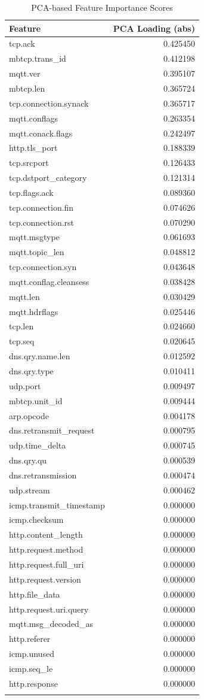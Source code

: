 \documentclass{article}
\begin{document}
\begin{longtable}{lr}
\toprule
Feature & PCA Loading (abs) \\
\midrule
tcp.ack & 0.425450 \\
mbtcp.trans_id & 0.412198 \\
mqtt.ver & 0.395107 \\
mbtcp.len & 0.365724 \\
tcp.connection.synack & 0.365717 \\
mqtt.conflags & 0.263354 \\
mqtt.conack.flags & 0.242497 \\
http.tls_port & 0.188339 \\
tcp.srcport & 0.126433 \\
tcp.dstport_category & 0.121314 \\
tcp.flags.ack & 0.089360 \\
tcp.connection.fin & 0.074626 \\
tcp.connection.rst & 0.070290 \\
mqtt.msgtype & 0.061693 \\
mqtt.topic_len & 0.048812 \\
tcp.connection.syn & 0.043648 \\
mqtt.conflag.cleansess & 0.038428 \\
mqtt.len & 0.030429 \\
mqtt.hdrflags & 0.025446 \\
tcp.len & 0.024660 \\
tcp.seq & 0.020645 \\
dns.qry.name.len & 0.012592 \\
dns.qry.type & 0.010411 \\
udp.port & 0.009497 \\
mbtcp.unit_id & 0.009444 \\
arp.opcode & 0.004178 \\
dns.retransmit_request & 0.000795 \\
udp.time_delta & 0.000745 \\
dns.qry.qu & 0.000539 \\
dns.retransmission & 0.000474 \\
udp.stream & 0.000462 \\
icmp.transmit_timestamp & 0.000000 \\
icmp.checksum & 0.000000 \\
http.content_length & 0.000000 \\
http.request.method & 0.000000 \\
http.request.full_uri & 0.000000 \\
http.request.version & 0.000000 \\
http.file_data & 0.000000 \\
http.request.uri.query & 0.000000 \\
mqtt.msg_decoded_as & 0.000000 \\
http.referer & 0.000000 \\
icmp.unused & 0.000000 \\
icmp.seq_le & 0.000000 \\
http.response & 0.000000 \\
\bottomrule
\caption{PCA-based Feature Importance Scores}
\end{longtable}
\end{document}
